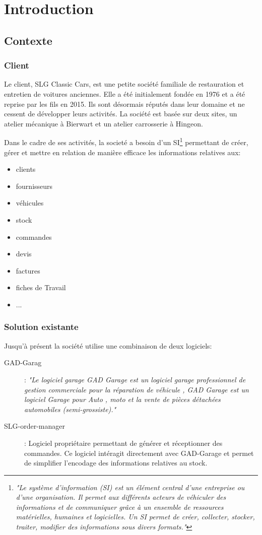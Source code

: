 \section{Introduction}
\subsection{Contexte}
\subsubsection{Client}

Le client, SLG Classic Cars, est une petite société familiale de restauration et entretien de voitures anciennes. Elle a été initialement fondée en 1976 et a été reprise par les fils en 2015. Ils sont désormais réputés dans leur domaine et ne cessent de développer leurs activités. La société est basée sur deux sites, un atelier mécanique à Bierwart et un atelier carrosserie à Hingeon. 

\newpara

Dans le cadre de ses activités, la societé a besoin d'un SI\footnote{\textit{"Le système d’information (SI) est un élément central d’une entreprise ou d’une organisation. Il permet aux différents acteurs de véhiculer des informations et de communiquer grâce à un ensemble de ressources matérielles, humaines et logicielles. Un SI permet de créer, collecter, stocker, traiter, modifier des informations sous divers formats."}\cite{SI}} permettant de créer, gérer et mettre en relation de manière efficace les informations relatives aux:
\begin{itemize}
  \item clients 
  \item fournisseurs
  \item véhicules
  \item stock
  \item commandes
  \item devis
  \item factures
  \item fiches de Travail
  \item ...
\end{itemize}

\subsubsection{Solution existante} 

Jusqu'à présent la société utilise une combinaison de deux logiciels:
\begin{description}
  \item[GAD-Garag] : \textit{"Le logiciel garage GAD Garage est un logiciel garage professionnel de gestion commerciale pour la réparation de véhicule , GAD Garage est un logiciel Garage pour Auto , moto et la vente de pièces détachées automobiles (semi-grossiste)."}\cite{GAD}
  \item[SLG-order-manager] : Logiciel propriétaire permettant de générer et réceptionner des commandes. Ce logiciel intéragit directement avec GAD-Garage et permet de simplifier l'encodage des informations relatives au stock. 
\end{description}

